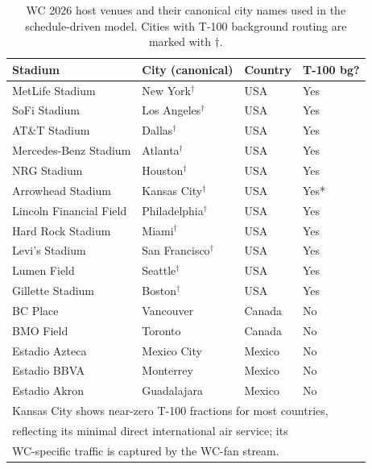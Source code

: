 \documentclass[12pt]{article}
\begin{document}
\begin{table}[h!]
\centering
\caption{WC 2026 host venues and their canonical city names used in the
  schedule-driven model. Cities with T-100 background routing are
  marked with $\dagger$.}
\label{tab:venues}
\begin{tabular}{llll}
\toprule
\textbf{Stadium} & \textbf{City (canonical)} & \textbf{Country} &
\textbf{T-100 bg?} \\
\midrule
MetLife Stadium        & New York$^\dagger$     & USA    & Yes \\
SoFi Stadium           & Los Angeles$^\dagger$  & USA    & Yes \\
AT\&T Stadium          & Dallas$^\dagger$       & USA    & Yes \\
Mercedes-Benz Stadium  & Atlanta$^\dagger$      & USA    & Yes \\
NRG Stadium            & Houston$^\dagger$      & USA    & Yes \\
Arrowhead Stadium      & Kansas City$^\dagger$  & USA    & Yes* \\
Lincoln Financial Field& Philadelphia$^\dagger$ & USA    & Yes \\
Hard Rock Stadium      & Miami$^\dagger$        & USA    & Yes \\
Levi's Stadium         & San Francisco$^\dagger$& USA    & Yes \\
Lumen Field            & Seattle$^\dagger$      & USA    & Yes \\
Gillette Stadium       & Boston$^\dagger$       & USA    & Yes \\
BC Place               & Vancouver              & Canada & No  \\
BMO Field              & Toronto                & Canada & No  \\
Estadio Azteca         & Mexico City            & Mexico & No  \\
Estadio BBVA           & Monterrey              & Mexico & No  \\
Estadio Akron          & Guadalajara            & Mexico & No  \\
\bottomrule
\multicolumn{4}{l}{\footnotesize * Kansas City shows near-zero T-100 fractions for most countries,} \\
\multicolumn{4}{l}{\footnotesize reflecting its minimal direct international air service; its} \\
\multicolumn{4}{l}{\footnotesize WC-specific traffic is captured by the WC-fan stream.} \\
\end{tabular}
\end{table}
\end{document}
